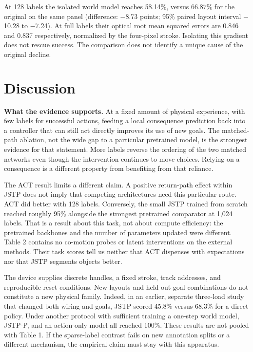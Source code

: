 \documentclass[11pt]{article}
\begin{document}
At 128 labels the isolated world model reaches 58.14\%, versus 66.87\% for the original on the same panel (difference: \ensuremath{-}8.73 points; 95\% paired layout interval \ensuremath{-}10.28 to \ensuremath{-}7.24). At full labels their optical root mean squared errors are 0.846 and 0.837 respectively, normalized by the four-pixel stroke. Isolating this gradient does not rescue success. The comparison does not identify a unique cause of the original decline.

\FloatBarrier\section{Discussion}

\textbf{What the evidence supports.} At a fixed amount of physical experience, with few labels for successful actions, feeding a local consequence prediction back into a controller that can still act directly improves its use of new goals. The matched-path ablation, not the wide gap to a particular pretrained model, is the strongest evidence for that statement. More labels reverse the ordering of the two matched networks even though the intervention continues to move choices. Relying on a consequence is a different property from benefiting from that reliance.

The ACT result limits a different claim. A positive return-path effect within JSTP does not imply that competing architectures need this particular route. ACT did better with 128 labels. Conversely, the small JSTP trained from scratch reached roughly 95\% alongside the strongest pretrained comparator at 1,024 labels. That is a result about this task, not about compute efficiency: the pretrained backbones and the number of parameters updated were different. Table 2 contains no co-motion probes or latent interventions on the external methods. Their task scores tell us neither that ACT dispenses with expectations nor that JSTP segments objects better.

The device supplies discrete handles, a fixed stroke, track addresses, and reproducible reset conditions. New layouts and held-out goal combinations do not constitute a new physical family. Indeed, in an earlier, separate three-load study that changed both wiring and goals, JSTP scored 45.8\% versus 68.3\% for a direct policy. Under another protocol with sufficient training a one-step world model, JSTP-P, and an action-only model all reached 100\%. These results are not pooled with Table 1. If the sparse-label contrast fails on new annotation splits or a different mechanism, the empirical claim must stay with this apparatus.
\end{document}
